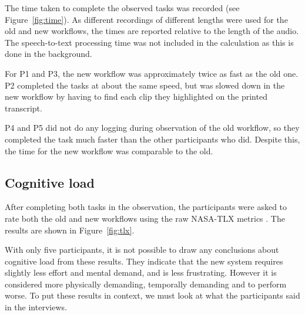 The time taken to complete the observed tasks was recorded (see
Figure~\ref{fig:time}). As different recordings of different lengths were used
for the old and new workflows, the times are reported relative to the length of
the audio. The speech-to-text processing time was not included in the
calculation as this is done in the background.

For P1 and P3, the new workflow was approximately twice as fast as the old one.
P2 completed the tasks at about the same speed, but was slowed down in the new
workflow by having to find each clip they highlighted on the printed
transcript.

P4 and P5 did not do any logging during observation of the old workflow,
so they completed the task much faster than the other participants who did.
Despite this, the time for the new workflow was comparable to the old.

\subsection{Cognitive load}



After completing both tasks in the observation, the participants were asked to
rate both the old and new workflows using the raw NASA-TLX metrics
\cite{Hart1988}.  The results are shown in Figure~\ref{fig:tlx}.

With only five participants, it is not possible to draw any conclusions about
cognitive load from these results.  They indicate that the new system requires
slightly less effort and mental demand, and is less frustrating. However it is
considered more physically demanding, temporally demanding and to perform
worse. To put these results in context, we must look at what the participants
said in the interviews.

